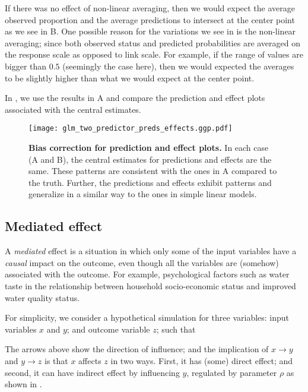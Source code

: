 If there was no effect of non-linear averaging, then we would expect the average observed proportion and the average predictions to intersect at the center point as we see in B. One possible reason for the variations we see in  is the non-linear averaging; since both observed status and predicted probabilities are averaged on the response scale as opposed to link scale. For example, if the range of values are bigger than $0.5$ (seemingly the case here), then we would expected the averages to be slightly higher than what we would expect at the center point.

In , we use the results in A and compare the prediction and effect plots associated with the central estimates. 

\begin{figure}
\begin{center}
\texttt{[image: glm\_two\_predictor\_preds\_effects.ggp.pdf]}
\end{center}
\caption{{\bf Bias correction for prediction and effect plots.} In each case (A and B), the central estimates for predictions and effects are the same. These patterns are  consistent with the ones in A compared to the truth. Further, the predictions and effects exhibit patterns and generalize in a similar way to the ones in simple linear models.
}
\label{fig:pred_bin_prediction_effects_plots}
\end{figure}

\subsection{Mediated effect}

A \emph{mediated} effect is a situation in which only some of the input variables have a \emph{causal} impact on the outcome, even though all the variables are (somehow) associated with the outcome. For example, psychological factors such as water taste in the relationship between household socio-economic status and improved water quality status.

For simplicity, we consider a hypothetical simulation for three variables: input variables $x$ and $y$; and outcome variable $z$; such that
%
\begin{center}
\end{center}
%
The arrows above show the direction of influence; and the implication of $x\rightarrow y$ and $y \rightarrow z$ is that $x$ affects $z$ in two ways. First, it has (some) direct effect; and second, it can have indirect effect by influencing $y$, regulated by parameter $\rho$ as shown in .

